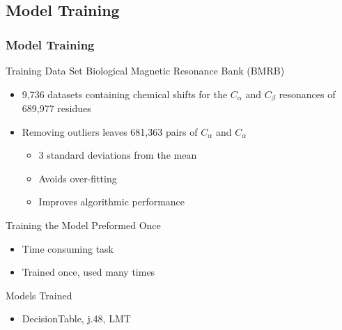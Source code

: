 \documentclass{beamer}
\begin{document}
\subsection{Model Training} 
\begin{frame}
	\frametitle{Model Training}
	\begin{block}{Training Data Set}
		Biological Magnetic Resonance Bank (BMRB)
		\begin{itemize}
			\item 9,736 datasets containing chemical shifts for the $C_{\alpha}$ and $C_{\beta}$  resonances of 689,977 residues
			\item Removing outliers leaves 681,363 pairs of $C_{\alpha}$ and $C_{\alpha}$
			\begin{itemize}
				\item 3 standard deviations from the mean
				\item Avoids over-fitting
				\item Improves algorithmic performance 
			\end{itemize}
		\end{itemize}
	\end{block}
	\begin{block}{Training the Model}
		Preformed Once
		\begin{itemize}
			\item Time consuming task
			\item Trained once, used many times
		\end{itemize}
		Models Trained
		\begin{itemize}
			\item DecisionTable, j.48, LMT
		\end{itemize}
	\end{block}
\end{frame}
\end{document}
